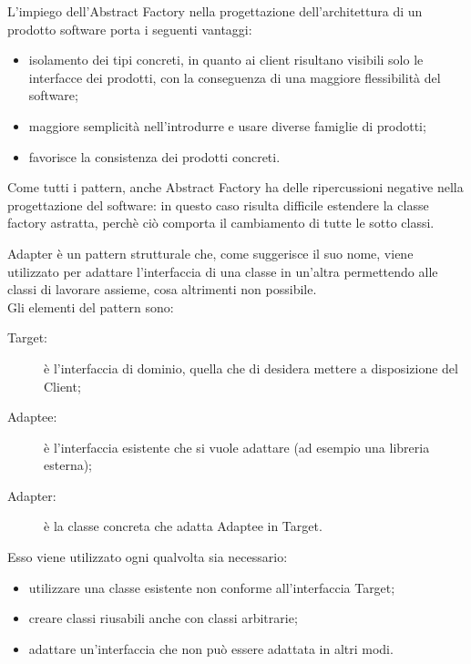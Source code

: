 L'impiego dell'Abstract Factory nella progettazione dell'architettura di un prodotto software porta i seguenti vantaggi:
\begin{itemize}
\item isolamento dei tipi concreti, in quanto ai client risultano visibili solo le interfacce dei prodotti, con la conseguenza di una maggiore flessibilità del software;
\item maggiore semplicità nell'introdurre e usare diverse famiglie di prodotti;
\item favorisce la consistenza dei prodotti concreti.
\end{itemize}
Come tutti i pattern, anche Abstract Factory ha delle ripercussioni negative nella progettazione del software: in questo caso risulta difficile estendere la classe factory astratta, perchè ciò comporta il cambiamento di tutte le sotto classi.

 \label{app:adapter}
Adapter è un pattern strutturale che, come suggerisce il suo nome, viene utilizzato per adattare l'interfaccia di una classe in un'altra permettendo alle classi di lavorare assieme, cosa altrimenti non possibile.\\
Gli elementi del pattern sono:
\begin{description}
\item[Target:] è l'interfaccia di dominio, quella che di desidera mettere a disposizione del Client;
\item[Adaptee:] è l'interfaccia esistente che si vuole adattare (ad esempio una libreria esterna);
\item[Adapter:] è la classe concreta che adatta Adaptee in Target.
\end{description}

Esso viene utilizzato ogni qualvolta sia necessario:
\begin{itemize}
\item utilizzare una classe esistente non conforme all'interfaccia Target;
\item creare classi riusabili anche con classi arbitrarie;
\item adattare un'interfaccia che non può essere adattata in altri modi.
\end{itemize}

